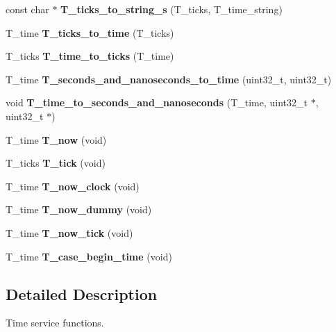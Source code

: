 \begin{DoxyCompactItemize}
const char $\ast$ {\bfseries T\+\_\+ticks\+\_\+to\+\_\+string\+\_\+s} (T\+\_\+ticks, T\+\_\+time\+\_\+string)
\item 
\mbox{\label{group__RTEMSTestFrameworkTime_ga8f949cd5e8e5c3f0e0838740ba1a037c}} 
T\+\_\+time {\bfseries T\+\_\+ticks\+\_\+to\+\_\+time} (T\+\_\+ticks)
\item 
\mbox{\label{group__RTEMSTestFrameworkTime_gaddf5ebf144e738c80e087130ece28fb6}} 
T\+\_\+ticks {\bfseries T\+\_\+time\+\_\+to\+\_\+ticks} (T\+\_\+time)
\item 
\mbox{\label{group__RTEMSTestFrameworkTime_ga6c48dba64b28ef0f0ef7b83181a4528b}} 
T\+\_\+time {\bfseries T\+\_\+seconds\+\_\+and\+\_\+nanoseconds\+\_\+to\+\_\+time} (uint32\+\_\+t, uint32\+\_\+t)
\item 
\mbox{\label{group__RTEMSTestFrameworkTime_ga4e6410fa20c8de6ba2a1ce019a9f4f11}} 
void {\bfseries T\+\_\+time\+\_\+to\+\_\+seconds\+\_\+and\+\_\+nanoseconds} (T\+\_\+time, uint32\+\_\+t $\ast$, uint32\+\_\+t $\ast$)
\item 
\mbox{\label{group__RTEMSTestFrameworkTime_gabb8cf99617c7b98a1637234b6d3c4914}} 
T\+\_\+time {\bfseries T\+\_\+now} (void)
\item 
\mbox{\label{group__RTEMSTestFrameworkTime_ga3b353c07537137de30e02abb293a504f}} 
T\+\_\+ticks {\bfseries T\+\_\+tick} (void)
\item 
\mbox{\label{group__RTEMSTestFrameworkTime_gaa0d1d09a2e04c415e1498d44b7707ac1}} 
T\+\_\+time {\bfseries T\+\_\+now\+\_\+clock} (void)
\item 
\mbox{\label{group__RTEMSTestFrameworkTime_gab2dc63e6ee79f377c56d6b8836d9cfda}} 
T\+\_\+time {\bfseries T\+\_\+now\+\_\+dummy} (void)
\item 
\mbox{\label{group__RTEMSTestFrameworkTime_gad4a29fb2fae8a9e15a864d78bc23da46}} 
T\+\_\+time {\bfseries T\+\_\+now\+\_\+tick} (void)
\item 
\mbox{\label{group__RTEMSTestFrameworkTime_ga04e3c1465a2a553d8accecedceedaaa1}} 
T\+\_\+time {\bfseries T\+\_\+case\+\_\+begin\+\_\+time} (void)
\end{DoxyCompactItemize}


\subsection{Detailed Description}
Time service functions. 

